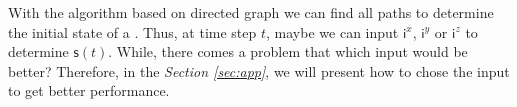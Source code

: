 With the algorithm based on directed graph we can find all paths to determine the initial state of a \BCN. Thus, at time step $t$, maybe we can input $\mathsf{i}^x$, $\mathsf{i}^y$ or $\mathsf{i}^z$ to determine $\mathsf{s}(t)$. While, there comes a problem that which input would be better? Therefore, in the {\em Section \ref{sec:app}}, we will present how to chose the input to get better performance.

